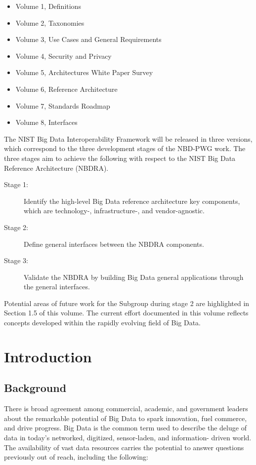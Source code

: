 \documentclass[11pt]{article}
\begin{document}
\begin{itemize}
\item	Volume 1, Definitions
\item	Volume 2, Taxonomies 
\item	Volume 3, Use Cases and General Requirements
\item	Volume 4, Security and Privacy 
\item	Volume 5, Architectures White Paper Survey
\item	Volume 6, Reference Architecture
\item	Volume 7, Standards Roadmap
\item       Volume 8, Interfaces
\end{itemize}


The NIST Big Data Interoperability Framework will be released in three versions, which correspond to 
the three development stages of the NBD-PWG work. The three stages aim to achieve the following with 
respect to the NIST Big Data Reference Architecture (NBDRA).

\begin{description}
\item[Stage 1:]	 Identify the high-level Big Data reference architecture key components, which are 
technology-, infrastructure-, and vendor-agnostic.
\item[Stage 2:]	 Define general interfaces between the NBDRA components.
\item[Stage 3:]	 Validate the NBDRA by building Big Data general applications through the general 
interfaces.
\end{description}

Potential areas of future work for the Subgroup during stage 2 are highlighted in Section 1.5 of this 
volume. The current effort documented in this volume reflects concepts developed within the rapidly 
evolving field of Big Data.



\section{Introduction}

\subsection{Background}

There is broad agreement among commercial, academic, and government leaders about the remarkable 
potential of Big Data to spark innovation, fuel commerce, and drive progress. Big Data is the common 
term used to describe the deluge of data in today’s networked, digitized, sensor-laden, and information-
driven world. The availability of vast data resources carries the potential to answer questions previously 
out of reach, including the following:
\end{document}
